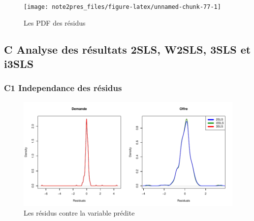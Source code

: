 \documentclass[11pt,]{article}
\begin{document}
\FloatBarrier

\FloatBarrier

\begin{figure}[!htbp]

{\centering \texttt{[image: note2pres\_files/figure-latex/unnamed-chunk-77-1]} 

}

\caption{Les PDF des résidus}\label{fig:unnamed-chunk-77}
\end{figure}

\FloatBarrier

\newpage

\hypertarget{c-analyse-des-resultats-2sls-w2sls-3sls-et-i3sls}{%
\subsection{C Analyse des résultats 2SLS, W2SLS, 3SLS et
i3SLS}\label{c-analyse-des-resultats-2sls-w2sls-3sls-et-i3sls}}

\FloatBarrier

\FloatBarrier

\hypertarget{c1-independance-des-residus}{%
\subsubsection{C1 Independance des
résidus}\label{c1-independance-des-residus}}

\FloatBarrier

\FloatBarrier

\FloatBarrier

\begin{figure}[!htbp]

{\centering \includegraphics{note2pres_files/figure-latex/unnamed-chunk-82-1} 

}

\caption{Les résidus contre la variable prédite}\label{fig:unnamed-chunk-82}
\end{figure}
\end{document}
